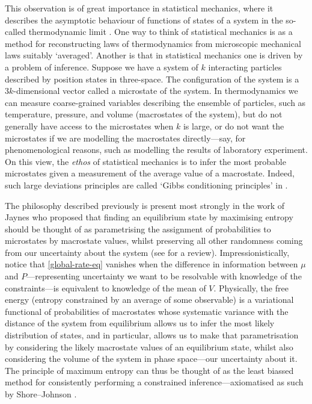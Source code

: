 \documentclass[11pt]{amsart}
\numberwithin{equation}{section}
\theoremstyle{remark}
\theoremstyle{remark}
\begin{document}
This observation is of great importance in statistical mechanics, where it describes the asymptotic behaviour of functions of states of a system in the so-called thermodynamic limit \cite{ellis2006entropy, touchette2009large}. 
One way to think of statistical mechanics is as a method for reconstructing laws of thermodynamics from microscopic mechanical laws suitably `averaged'. Another is that in statistical mechanics one is driven by a problem of inference. Suppose we have a system of $k$ interacting particles described by position states in three-space. The configuration of the system is a $3k$-dimensional vector called a microstate of the system. In thermodynamics we can measure coarse-grained variables describing the ensemble of particles, such as temperature, pressure, and volume (macrostates of the system), but do not generally have access to the microstates when $k$ is large, or do not want the microstates if we are modelling the macrostates directly---say, for phenomenological reasons, such as modelling the results of laboratory experiment. On this view, the {\it ethos} of statistical mechanics is to infer the most probable microstates given a measurement of the average value of a macrostate. Indeed, such large deviations principles are called `Gibbs conditioning principles' in \cite{dembo1996refinements}.

The philosophy described previously is present most strongly in the work of Jaynes \cite{jaynes1957information, jaynes1980minimum} who proposed that finding an equilibrium state by maximising entropy should be thought of as parametrising the assignment of probabilities to microstates by macrostate values, whilst preserving all other randomness coming from our uncertainty about the system (see \cite{ken} for a review). Impressionistically, notice that \eqref{global-rate-eq} vanishes when the difference in information between $\mu$ and $P$---representing uncertainty we want to be resolvable with knowledge of the constraints---is equivalent to knowledge of the mean of $V$. Physically, the free energy (entropy constrained by an average of some observable) is a variational functional of probabilities of macrostates whose systematic variance with the distance of the system from equilibrium allows us to infer the most likely distribution of states, and in particular, allows us to make that parametrisation by considering the likely macrostate values of an equilibrium state, whilst also considering the volume of the system in phase space---our uncertainty about it. The principle of maximum entropy can thus be thought of as the least biassed method for consistently performing a constrained inference---axiomatised as such by Shore--Johnson \cite{shore1980axiomatic, presse2013nonadditive}. 
\end{document}
